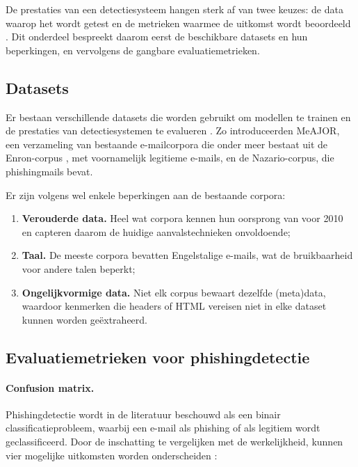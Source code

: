 De prestaties van een detectiesysteem hangen sterk af van twee keuzes: de data waarop het wordt getest en de metrieken waarmee de uitkomst wordt beoordeeld \autocite{Salloum2022}. Dit onderdeel bespreekt daarom eerst de beschikbare datasets en hun beperkingen, en vervolgens de gangbare evaluatiemetrieken.

\subsection{Datasets}%
\label{subsec:datasets}

Er bestaan verschillende datasets die worden gebruikt om modellen te trainen en de prestaties van detectiesystemen te evalueren \autocite{Salloum2022}. Zo introduceerden \textcite{Mendes2025} MeAJOR, een verzameling van bestaande e-mailcorpora die onder meer bestaat uit de Enron-corpus \autocite{klimt2004}, met voornamelijk legitieme e-mails, en de Nazario-corpus, die phishingmails bevat.

Er zijn volgens \textcite{Pajola2025} wel enkele beperkingen aan de bestaande corpora:
\begin{enumerate}
    \item \textbf{Verouderde data.} Heel wat corpora kennen hun oorsprong van voor 2010 en capteren daarom de huidige aanvalstechnieken onvoldoende;
    \item \textbf{Taal.} De meeste corpora bevatten Engelstalige e-mails, wat de bruikbaarheid voor andere talen beperkt;
    \item \textbf{Ongelijkvormige data.} Niet elk corpus bewaart dezelfde (meta)data, waardoor kenmerken die headers of HTML vereisen niet in elke dataset kunnen worden geëxtraheerd.
\end{enumerate}

\subsection{Evaluatiemetrieken voor phishingdetectie}%
\label{subsec:evaluatiemetrieken}

\paragraph{Confusion matrix.}
Phishingdetectie wordt in de literatuur beschouwd als een binair classificatieprobleem, waarbij een e-mail als phishing of als legitiem wordt geclassificeerd. Door de inschatting te vergelijken met de werkelijkheid, kunnen vier mogelijke uitkomsten worden onderscheiden \autocite{Powers2020}:

